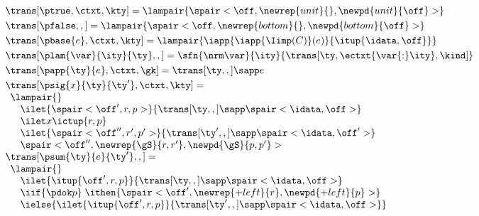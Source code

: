 \begin{figure}
\small
{} 

\[
\begin{array}{l}
\trans[\ptrue,\ctxt,\kty] =
  \lampair{\spair<\off,\newrep{unit}{},\newpd{unit}{\off}>}
\\[3pt] %
\trans[\pfalse,,] =
  \lampair{\spair<\off,\newrep {bottom}{},\newpd {bottom}{\off}>}
\\[3pt] %
\trans[\pbase{e},\ctxt,\kty] =
  \lampair{\iapp {\iapp {\Iimp(C)} (e)} {\itup {\idata,\off}}}
\\[3pt] %
\trans[\plam{\var}{\ity}{\ty},,] =
   \sfn{\nrm\var}{\ity}{\trans[\ty,\ectxt{\var{:}\ity},\kind]}
\\[3pt] %
\trans[\papp{\ty}{e},\ctxt,\gk] =
  \trans[\ty,,] \sapp e  
\\[3pt]
\trans[\psig{x}{\ty}{\ty'},\ctxt,\kty] = \\
  \begin{array}{l}  
    \lampair{} \\
    \quad  \ilet {\spair<\off',r,p>} 
    {{\trans[\ty,,]} \sapp \spair<\idata,\off>} \\
    \quad  \ilet x {\ictup{r,p}}\\
    \quad  \ilet {\spair<\off'',r',p'>} 
    {{\trans[\ty',,]} \sapp \spair<\idata,\off'>} \\
    \quad \spair<\off'',\newrep {\gS}{r,r'},\newpd {\gS}{p,p'}>
  \end{array}  
\\[3pt]
  \trans[\psum{\ty}{e}{\ty'},,] = \\
  \begin{array}{l}  
  \lampair{} \\
  \quad \ilet {\itup{\off',r,p}}{\trans[\ty,,] \sapp \spair<\idata,\off>} \\
  \quad \iif {\pdok p} \; \ithen {
    \def \r {\newrep {+left}{r}}
    \def \p {\newpd {+left}{p}}
    \spair<\off',\r,\p>} \\
  \quad \ielse {\ilet {\itup{\off',r,p}}{\trans[\ty',,] \sapp \spair<\idata,\off>}} \\
  \quad 
  {  %
}
\end{array}
\end{array}\]
\end{figure}
